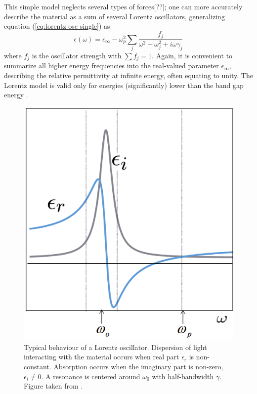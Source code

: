 This simple model neglects several types of forces[??]; one can more accurately describe the material as a sum of several Lorentz oscillators, generalizing equation (\ref{eq:lorentz osc single}) as
\begin{equation}
    \epsilon(\omega) = \epsilon_\infty - \omega_p^2\sum_{j}\frac{f_j}{\omega^2-\omega_j^2+i\omega\gamma_j}
    \label{eq:lorentz osc sum}
\end{equation}
where $f_j$ is the oscillator strength with $\sum f_j = 1$. Again, it is convenient to summarize all higher energy frequencies into the real-valued parameter $\epsilon_\infty$, describing the relative permittivity at infinite energy, often equating to unity. The Lorentz model is valid only for energies (significantly) lower than the band gap energy .
\begin{figure}
    \centering
    \includegraphics[scale=0.3]{figures/Ch2/Lorentzian.png}
    
    \caption{Typical behaviour of a Lorentz oscillator. Dispersion of light interacting with the material occurs when real part $\epsilon_r$ is non-constant. Absorption occurs when the imaginary part is non-zero, $\epsilon_i \neq 0$. A resonance is centered around $\omega_0$ with half-bandwidth $\gamma$. Figure taken from \cite{web:lorentzMIT}.}
    \label{fig:lorentzian}
\end{figure}



